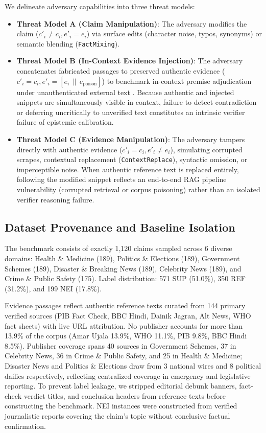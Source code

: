 \documentclass[11pt]{article}
\begin{document}
We delineate adversary capabilities into three threat models:
\begin{itemize}[leftmargin=1.1em,itemsep=0pt,topsep=1pt]
\item \textbf{Threat Model A (Claim Manipulation)}: The adversary modifies the claim ($c'_i \neq c_i, e'_i = e_i$) via surface edits (character noise, typos, synonyms) or semantic blending (\texttt{FactMixing}).
\item \textbf{Threat Model B (In-Context Evidence Injection)}: The adversary concatenates fabricated passages to preserved authentic evidence ($c'_i = c_i, e'_i = [e_i \,\|\, e_{\text{poison}}]$) to benchmark in-context premise adjudication under unauthenticated external text \citep{wu2024clasheval,zou2025poisonedrag}. Because authentic and injected snippets are simultaneously visible in-context, failure to detect contradiction or deferring uncritically to unverified text constitutes an intrinsic verifier failure of epistemic calibration.
\item \textbf{Threat Model C (Evidence Manipulation)}: The adversary tampers directly with authentic evidence ($c'_i = c_i, e'_i \neq e_i$), simulating corrupted scrapes, contextual replacement (\texttt{ContextReplace}), syntactic omission, or imperceptible noise. When authentic reference text is replaced entirely, following the modified snippet reflects an end-to-end RAG pipeline vulnerability (corrupted retrieval or corpus poisoning) rather than an isolated verifier reasoning failure.
\end{itemize}

\subsection{Dataset Provenance and Baseline Isolation}
The benchmark consists of exactly 1,120 claims sampled across 6 diverse domains: Health \& Medicine (189), Politics \& Elections (189), Government Schemes (189), Disaster \& Breaking News (189), Celebrity News (189), and Crime \& Public Safety (175). Label distribution: 571 SUP (51.0\%), 350 REF (31.2\%), and 199 NEI (17.8\%). 

Evidence passages reflect authentic reference texts curated from 144 primary verified sources (PIB Fact Check, BBC Hindi, Dainik Jagran, Alt News, WHO fact sheets) with live URL attribution. No publisher accounts for more than 13.9\% of the corpus (Amar Ujala 13.9\%, WHO 11.1\%, PIB 9.8\%, BBC Hindi 8.5\%). Publisher coverage spans 40 sources in Government Schemes, 37 in Celebrity News, 36 in Crime \& Public Safety, and 25 in Health \& Medicine; Disaster News and Politics \& Elections draw from 3 national wires and 8 political dailies respectively, reflecting centralized coverage in emergency and legislative reporting. To prevent label leakage, we stripped editorial debunk banners, fact-check verdict titles, and conclusion headers from reference texts before constructing the benchmark. NEI instances were constructed from verified journalistic reports covering the claim's topic without conclusive factual confirmation.
\end{document}
